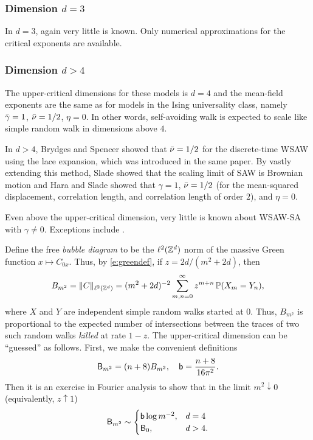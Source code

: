 \subsubsection{Dimension $d = 3$}

In $d = 3$, again very little is known. Only numerical approximations for
the critical exponents are available.

\subsubsection{Dimension $d > 4$}

The upper-critical dimensions for these models is $d = 4$ and the mean-field
exponents are the same as for models in the Ising universality class, namely
$\bar\gamma=1$, $\bar\nu = 1/2$, $\eta = 0$. In other words, self-avoiding walk
is expected to scale like simple random walk in dimensions above $4$.

In $d > 4$, Brydges and Spencer \cite{BS85} showed that $\bar\nu = 1/2$ for the
discrete-time WSAW using the lace expansion, which was introduced in the same paper.
By vastly extending this method, Slade \cite{Slad88} showed that the scaling limit
of SAW is Brownian motion and Hara and Slade \cite{HS92a,HS92b} showed that
$\gamma = 1$, $\bar\nu = 1/2$ (for the mean-squared displacement, correlation length,
and correlation length of order $2$), and $\eta = 0$.

Even above the upper-critical dimension, very little is known about WSAW-SA with
$\gamma \ne 0$. Exceptions include \cite{HH17,Uelt02}.

\begin{rk}
\label{rk:bubble}
Define the free \emph{bubble diagram} to be the $\ell^2({ {{\mathbb Z}}^d })$ norm of the massive
Green function $x \mapsto C_{0x}$. Thus, by
\eqref{e:greendef}, if $z = 2 d / (m^2 + 2 d)$, then
\begin{equation}
\label{e:bubble-def}
B_{m^2}
	=
\|C\|_{\ell^2({ {{\mathbb Z}}^d })}
	=
(m^2 + 2 d)^{-2} \sum_{m,n=0}^\infty z^{m+n} \operatorname{\mathbb{P}}(X_m = Y_n),
\end{equation}
where $X$ and $Y$ are independent simple random walks started at $0$. Thus, $B_{m^2}$
is proportional to the expected number of intersections between the traces of two
such random walks \emph{killed} at rate $1 - z$. The upper-critical dimension can
be ``guessed'' as follows. First, we make the convenient definitions
\begin{equation}
\label{e:bubble}
{\sf B}_{m^2} = (n + 8) B_{m^2},
	\quad
{\sf b} = \frac{n + 8}{16\pi^2}.
\end{equation}
Then it is an exercise in Fourier analysis to show that in the limit $m^2\downarrow0$
(equivalently, $z\uparrow1$)
\begin{equation}
\label{e:bubble-log}
{\sf B}_{m^2}
	\sim
\begin{cases}
{\sf b} \log m^{-2},
	&
d = 4
	\\
{\sf B}_0,
	&
d > 4.
\end{cases}
\end{equation}
\end{rk}

